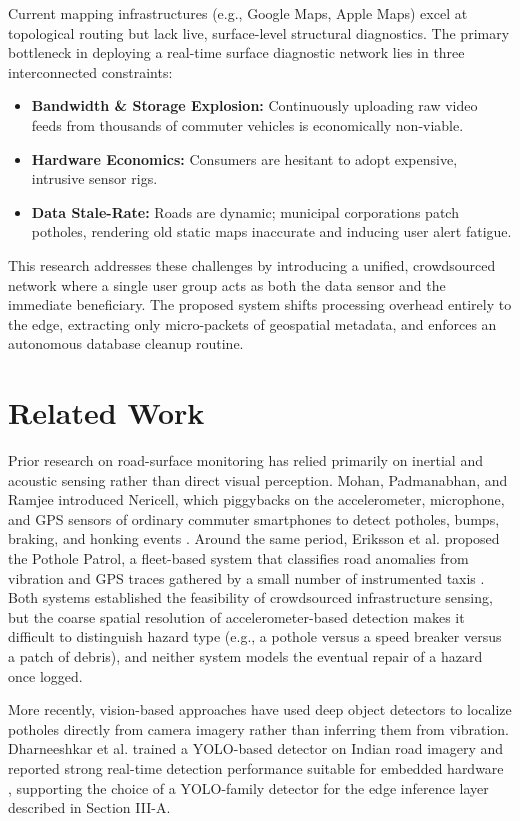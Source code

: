 \documentclass[conference]{IEEEtran}
\begin{document}
Current mapping infrastructures (e.g., Google Maps, Apple Maps) excel at topological routing but lack live, surface-level structural diagnostics. The primary bottleneck in deploying a real-time surface diagnostic network lies in three interconnected constraints:

\begin{itemize}
\item \textbf{Bandwidth \& Storage Explosion:} Continuously uploading raw video feeds from thousands of commuter vehicles is economically non-viable.
\item \textbf{Hardware Economics:} Consumers are hesitant to adopt expensive, intrusive sensor rigs.
\item \textbf{Data Stale-Rate:} Roads are dynamic; municipal corporations patch potholes, rendering old static maps inaccurate and inducing user alert fatigue.
\end{itemize}

This research addresses these challenges by introducing a unified, crowdsourced network where a single user group acts as both the data sensor and the immediate beneficiary. The proposed system shifts processing overhead entirely to the edge, extracting only micro-packets of geospatial metadata, and enforces an autonomous database cleanup routine.

\section{Related Work}

Prior research on road-surface monitoring has relied primarily on inertial and acoustic sensing rather than direct visual perception. Mohan, Padmanabhan, and Ramjee introduced Nericell, which piggybacks on the accelerometer, microphone, and GPS sensors of ordinary commuter smartphones to detect potholes, bumps, braking, and honking events \cite{b2}. Around the same period, Eriksson et al. proposed the Pothole Patrol, a fleet-based system that classifies road anomalies from vibration and GPS traces gathered by a small number of instrumented taxis \cite{b3}. Both systems established the feasibility of crowdsourced infrastructure sensing, but the coarse spatial resolution of accelerometer-based detection makes it difficult to distinguish hazard type (e.g., a pothole versus a speed breaker versus a patch of debris), and neither system models the eventual repair of a hazard once logged.

More recently, vision-based approaches have used deep object detectors to localize potholes directly from camera imagery rather than inferring them from vibration. Dharneeshkar et al. trained a YOLO-based detector on Indian road imagery and reported strong real-time detection performance suitable for embedded hardware \cite{b4}, supporting the choice of a YOLO-family detector for the edge inference layer described in Section III-A.
\end{document}
